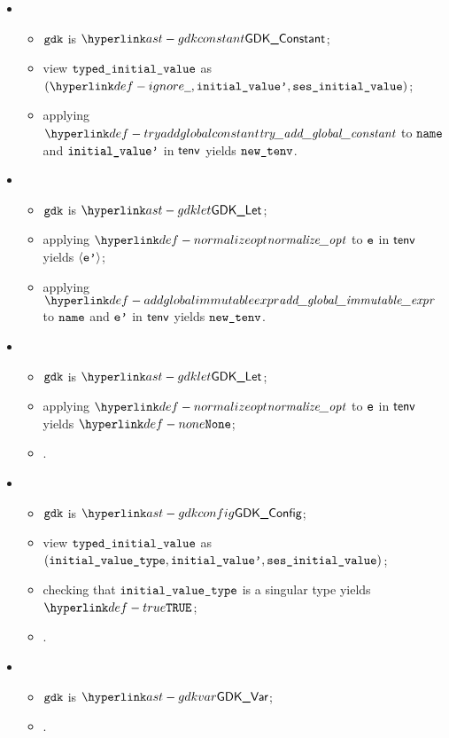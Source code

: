 \ProseParagraph
\OneApplies
\begin{itemize}
  \item {}
  \begin{itemize}
    \item $\texttt{gdk}$ is $\GDKConstant$;
    \item view $\texttt{typed\_initial\_value}$ as $(\Ignore, \initialvaluep, \vsesinitialvalue)$;
    \item applying $\tryaddglobalconstant$ to $\texttt{name}$ and $\texttt{initial\_value'}$ in $\tenv$ yields $\newtenv$.
  \end{itemize}

  \item {}
  \begin{itemize}
    \item $\texttt{gdk}$ is $\GDKLet$;
    \item applying $\normalizeopt$ to $\texttt{e}$ in $\tenv$ yields $\langle\texttt{e'}\rangle$\ProseOrTypeError;
    \item applying $\addglobalimmutableexpr$ to $\texttt{name}$ and $\texttt{e'}$ in $\tenv$ yields $\newtenv$.
  \end{itemize}

  \item {}
  \begin{itemize}
    \item $\texttt{gdk}$ is $\GDKLet$;
    \item applying $\normalizeopt$ to $\texttt{e}$ in $\tenv$ yields $\None$\ProseOrTypeError;
    \item \Proseeqdef{$\newtenv$}{$\tenv$}.
  \end{itemize}

  \item {}
  \begin{itemize}
    \item $\texttt{gdk}$ is $\GDKConfig$;
    \item view $\texttt{typed\_initial\_value}$ as \\ $(\texttt{initial\_value\_type}, \texttt{initial\_value'}, \texttt{ses\_initial\_value})$;
    \item checking that $\texttt{initial\_value\_type}$ is a singular type yields $\True$\ProseOrTypeError;
    \item \Proseeqdef{$\newtenv$}{$\tenv$}.
  \end{itemize}

  \item {}
  \begin{itemize}
    \item $\texttt{gdk}$ is $\GDKVar$;
    \item \Proseeqdef{$\newtenv$}{$\tenv$}.
  \end{itemize}
\end{itemize}

